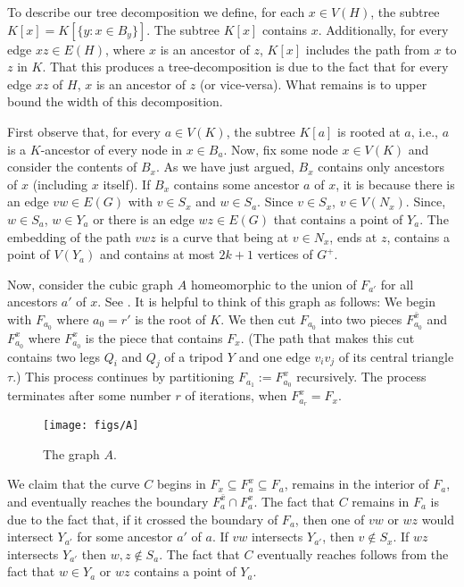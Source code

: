 \documentclass{patmorin}
\begin{document}
To describe our tree decomposition we define, for each $x\in V(H)$, the subtree $K[x]=K[\{y:x\in B_y\}]$.  The subtree $K[x]$ contains $x$.  Additionally, for every edge $xz\in E(H)$, where $x$ is an ancestor of $z$, $K[x]$ includes the path from $x$ to $z$ in $K$.  That this produces a tree-decomposition is due to the fact that for every edge $xz$ of $H$, $x$ is an ancestor of $z$ (or vice-versa).  What remains is to upper bound the width of this decomposition.

First observe that, for every $a\in V(K)$, the subtree $K[a]$ is rooted at $a$, i.e., $a$ is a $K$-ancestor of every node in $x\in B_a$.  Now, fix some node $x\in V(K)$ and consider the contents of $B_x$.  As we have just argued, $B_x$ contains only ancestors of $x$ (including $x$ itself). If $B_x$ contains some ancestor $a$ of $x$, it is because there is an edge $vw\in E(G)$ with $v\in S_x$ and $w\in S_a$. Since $v\in S_x$, $v\in V(N_x)$. Since, $w\in S_a$, $w\in Y_a$ or there is an edge $wz\in E(G)$ that contains a point of $Y_a$. The embedding of the path $vwz$ is a curve that being at $v\in N_x$, ends at
$z$, contains a point of $V(Y_a)$ and contains at most $2k+1$ vertices of $G^+$.

Now, consider the cubic graph $A$ homeomorphic to the union of $F_{a'}$ for all ancestors $a'$ of $x$. See .  It is helpful to think of this graph as follows:  We begin with $F_{a_0}$ where $a_0=r'$ is the root of $K$.  We then cut $F_{a_0}$ into two pieces $F^{\bar{x}}_{a_0}$ and $F^x_{a_0}$ where $F^x_{a_0}$ is the piece that contains $F_x$. (The path that makes this cut contains two legs $Q_i$ and $Q_j$ of a tripod $Y$ and one edge $v_iv_j$ of its central triangle $\tau$.)  This process continues by partitioning $F_{a_1}:=F^x_{a_0}$ recursively.  The process terminates after some number $r$ of iterations, when $F^x_{a_r}=F_x$.

\begin{figure}
  \begin{center}
    \texttt{[image: figs/A]}
  \end{center}
  \caption{The graph $A$.}
\end{figure}

We claim that the curve $C$ begins in $F_x\subseteq F^x_a\subseteq F_a$, remains in the interior of $F_a$, and eventually reaches the boundary $F^{\bar{x}}_a\cap F^x_a$.  The fact that $C$ remains in $F_a$ is due to the fact that, if it crossed the boundary of $F_a$, then one of $vw$ or $wz$ would intersect $Y_{a'}$ for some ancestor $a'$ of $a$.  If $vw$ intersects $Y_{a'}$, then $v\not\in S_x$.  If $wz$ intersects $Y_{a'}$ then $w,z\not\in S_a$. The fact that $C$ eventually reaches follows from the fact that $w\in Y_a$ or $wz$ contains a point of $Y_a$.
\end{document}
